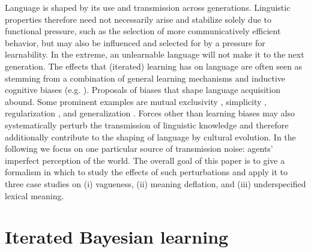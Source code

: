 \documentclass[10pt,a4paper]{article}
\begin{document}
Language is shaped by its use and transmission across generations. Linguistic properties
therefore need not necessarily arise and stabilize solely due to functional pressure, such as
the selection of more communicatively efficient behavior, but may also be influenced
and selected for by a pressure for learnability. In the extreme, an unlearnable language
will not make it to the next generation. The effects that (iterated) learning has on language
are often seen as stemming from a combination of general learning mechanisms and inductive
cognitive biases
(e.g. \citealt{griffiths+kalish:2007,kirby+etal:2014,tamariz+kirby:2016}). Proposals of biases
that shape language acquisition abound. Some prominent examples are mutual exclusivity
\citep{merriman+bowman:1989,clark:2009}, simplicity \citep{kirby+etal:2015}, regularization
\citep{hudson+etal:2005}, and generalization
\citep{smith:2011}.
Forces other than learning biases may also systematically perturb the transmission of
linguistic knowledge and therefore additionally contribute to the shaping of language by
cultural evolution.  In the following we focus on one particular source of transmission noise:
agents' imperfect perception of the world. The overall goal of this paper is to give a
formalism in which to study the effects of such perturbations and apply it to three case
studies on (i) vagueness, (ii) meaning deflation, and (iii) underspecified lexical meaning.

\section{Iterated Bayesian learning}
\end{document}
